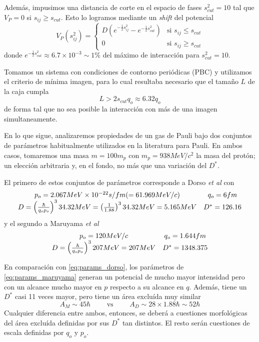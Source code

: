Además, impusimos una distancia de corte en el espacio de fases $s_{cut}^2=10$ tal que $V_P=0$ si $s_{ij}\geq s_{cut}$.
Esto lo logramos mediante un \textit{shift} del potencial
\[ V_P(s_{ij}^2) = \left\{\begin{matrix} D(e^{-\frac{1}{2}s_{ij}^2}-e^{-\frac{1}{2}s_{cut}^2}) & \text{si } s_{ij}\leq s_{cut} \\ 0 & \text{si } s_{ij}\geq s_{cut} \end{matrix}\right. \]
donde $e^{-\frac{1}{2}s_{cut}^2}\approx 6.7\times10^{-3}\sim 1\%$ del máximo de interacción para $s_{cut}^2=10$.

Tomamos un sistema con condiciones de contorno periódicas (PBC) y utilizamos el criterio de mínima imagen, para lo cual resultaba necesario que el tamaño $L$ de la caja cumpla
\[ L >2 s_{cut}q_o \approx 6.32q_o \]
de forma tal que no sea posible la interacción con más de una imagen simultaneamente. 

En lo que sigue, analizaremos propiedades de un gas de Pauli bajo dos conjuntos de parámetros habitualmente utilizados en la literatura para Pauli.
En ambos casos, tomaremos una masa $m=100m_p$ con $m_p=938MeV/c^2$ la masa del protón; un elección arbitraria y, en el fondo, no más que una variación del $D^*$.

El primero de estos conjuntos de parámetros corresponde a Dorso \textit{et al} con
\begin{equation}{\label{eq:params_dorso}}
 \begin{matrix}
  p_o = 2.067 MeV\times 10^{-22}s/fm (= 61.969 MeV/c) & q_o = 6 fm\\
  D = \left(\frac{\hbar}{q_op_o}\right)^3 34.32MeV = \left(\frac{1}{1.88}\right)^3 34.32MeV = 5.165MeV & D^* = 126.16
 \end{matrix}
\end{equation}
y el segundo a Maruyama \textit{et al}
\begin{equation}{\label{eq:params_maruyama}}
 \begin{matrix}
  p_o = 120 MeV/c & q_o = 1.644 fm\\
  D = \left(\frac{\hbar}{q_op_o}\right)^3 207MeV = 207MeV & D^* = 1348.375
 \end{matrix}
\end{equation}

En comparación con \eqref{eq:params_dorso}, los parámetros de \eqref{eq:params_maruyama} generan un potencial de mucho mayor intensidad pero con un alcance mucho mayor en $p$
respecto a su alcance en $q$.
Además, tiene un $D^*$ casi 11 veces mayor, pero tiene un área excluída muy similar
\[ A_M\sim 45\hbar \qquad \text{ vs } \qquad  A_D\sim 28\times1.88\hbar \sim 52\hbar\]
Cualquier diferencia entre ambos, entonces, se deberá a cuestiones morfológicas del área excluída definidas por sus $D^*$ tan distintos.
El resto serán cuestiones de escala definidas por $q_o$ y $p_o$.

